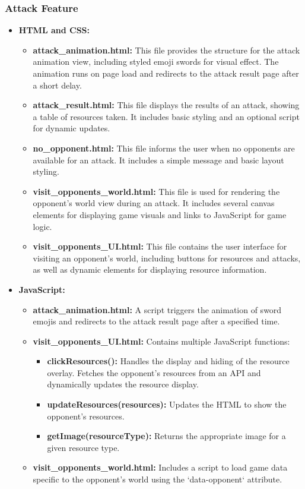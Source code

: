 \documentclass[12pt]{article}
\begin{document}
\subsubsection{Attack Feature}
\begin{itemize}
    \item \textbf{HTML and CSS:}
        \begin{itemize}
            \item \textbf{attack\_animation.html:} This file provides the structure for the attack animation view, including styled emoji swords for visual effect. The animation runs on page load and redirects to the attack result page after a short delay.
            \item \textbf{attack\_result.html:} This file displays the results of an attack, showing a table of resources taken. It includes basic styling and an optional script for dynamic updates.
            \item \textbf{no\_opponent.html:} This file informs the user when no opponents are available for an attack. It includes a simple message and basic layout styling.
            \item \textbf{visit\_opponents\_world.html:} This file is used for rendering the opponent's world view during an attack. It includes several canvas elements for displaying game visuals and links to JavaScript for game logic.
            \item \textbf{visit\_opponents\_UI.html:} This file contains the user interface for visiting an opponent's world, including buttons for resources and attacks, as well as dynamic elements for displaying resource information.
        \end{itemize}
    \item \textbf{JavaScript:}
        \begin{itemize}
            \item \textbf{attack\_animation.html:} A script triggers the animation of sword emojis and redirects to the attack result page after a specified time.
            \item \textbf{visit\_opponents\_UI.html:} Contains multiple JavaScript functions:
                \begin{itemize}
                    \item \textbf{clickResources():} Handles the display and hiding of the resource overlay. Fetches the opponent's resources from an API and dynamically updates the resource display.
                    \item \textbf{updateResources(resources):} Updates the HTML to show the opponent's resources.
                    \item \textbf{getImage(resourceType):} Returns the appropriate image for a given resource type.
                \end{itemize}
            \item \textbf{visit\_opponents\_world.html:} Includes a script to load game data specific to the opponent's world using the `data-opponent` attribute.
        \end{itemize}
\end{itemize}
\end{document}
